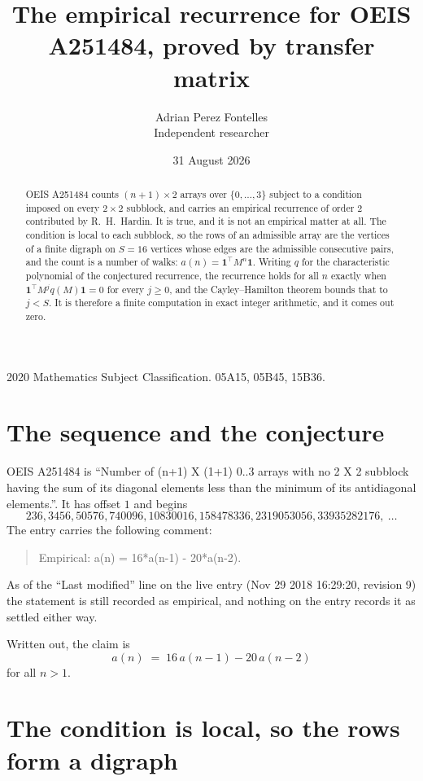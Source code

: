 \documentclass[11pt,a4paper]{article}
\title{The empirical recurrence for OEIS A251484, proved by transfer matrix}
\author{Adrian Perez Fontelles\\ \small Independent researcher}
\date{31 August 2026}
\theoremstyle{plain}
\theoremstyle{definition}
\begin{document}
\maketitle

\begin{abstract}
OEIS A251484 counts $(n+1)\times2$ arrays over $\{0,\dots,3\}$ subject to a condition imposed on
every $2\times2$ subblock, and carries an empirical recurrence of order $2$ contributed
by R.~H.~Hardin. It is true, and it is not an empirical matter at all. The condition is local
to each subblock, so the rows of an admissible array are the vertices of a finite digraph
on $S=16$ vertices whose edges are the admissible consecutive pairs, and the count is a
number of walks: $a(n)=\mathbf{1}^{\!\top}M^{n}\mathbf{1}$. Writing $q$
for the characteristic polynomial of the conjectured recurrence, the recurrence holds for all
$n$ exactly when $\mathbf{1}^{\!\top}M^{j}q(M)\mathbf{1}=0$ for every $j\ge0$, and the
Cayley--Hamilton theorem bounds that to $j<S$. It is therefore a finite computation in exact
integer arithmetic, and it comes out zero.
\end{abstract}

\noindent\small 2020 Mathematics Subject Classification. 05A15, 05B45, 15B36.\normalsize

\section{The sequence and the conjecture}

OEIS A251484 is ``Number of (n+1) X (1+1) 0..3 arrays with no 2 X 2 subblock having the sum of its diagonal elements less than the minimum of its antidiagonal elements.''. It has offset $1$ and begins
\[
236, 3456, 50576, 740096, 10830016, 158478336, 2319053056, 33935282176,\ \dots
\]
The entry carries the following comment:
\begin{quote}\small
Empirical: a(n) = 16*a(n-1) - 20*a(n-2).
\end{quote}
As of the ``Last modified'' line on the live entry (Nov 29 2018 16:29:20, revision 9) the statement is
still recorded as empirical, and nothing on the entry records it as settled either way.

Written out, the claim is
\begin{equation}\label{eq:conj}
a(n)\;=\;16\,a(n-1) - 20\,a(n-2)
\end{equation}
for all $n>1$.

\section{The condition is local, so the rows form a digraph}
\end{document}
